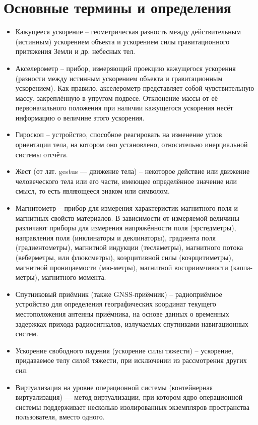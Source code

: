 \section{Основные термины и определения}

\begin{itemize}
    \item Кажущееся ускорение -- геометрическая разность между действительным (истинным) ускорением объекта и ускорением силы гравитационного притяжения Земли и др. небесных тел.
    \item Акселерометр -- прибор, измеряющий проекцию кажущегося ускорения (разности между истинным ускорением объекта и гравитационным ускорением). Как правило, акселерометр представляет собой чувствительную массу, закреплённую в упругом подвесе. Отклонение массы от её первоначального положения при наличии кажущегося ускорения несёт информацию о величине этого ускорения.
    \item Гироскоп -- устройство, способное реагировать на изменение углов ориентации тела, на котором оно установлено, относительно инерциальной системы отсчёта.
    \item Жест (от лат. gestus — движение тела) -- некоторое действие или движение человеческого тела или его части, имеющее определённое значение или смысл, то есть являющееся знаком или символом.
    \item Магнитометр -- прибор для измерения характеристик магнитного поля и магнитных свойств материалов. В зависимости от измеряемой величины различают приборы для измерения напряжённости поля (эрстедметры), направления поля (инклинаторы и деклинаторы), градиента поля (градиентометры), магнитной индукции (тесламетры), магнитного потока (веберметры, или флюксметры), коэрцитивной силы (коэрцитиметры), магнитной проницаемости (мю-метры), магнитной восприимчивости (каппа-метры), магнитного момента.
    \item Спутниковый приёмник (также GNSS-приёмник) -- радиоприёмное устройство для определения географических координат текущего местоположения антенны приёмника, на основе данных о временных задержках прихода радиосигналов, излучаемых спутниками навигационных систем.
    \item Ускорение свободного падения (ускорение силы тяжести) -- ускорение, придаваемое телу силой тяжести, при исключении из рассмотрения других сил.
    \item Виртуализация на уровне операционной системы (контейнерная виртуализация) — метод виртуализации, при котором ядро операционной системы поддерживает несколько изолированных экземпляров пространства пользователя, вместо одного.

\end{itemize}
